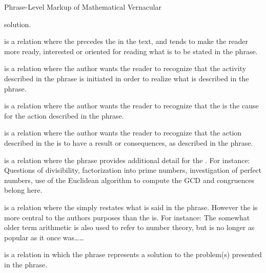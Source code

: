 \begin{module}[id=mtext]
\begin{omgroup}[id=mtext,short=Mathematical Text]
\begin{omgroup}[id=phrases]{Phrase-Level Markup of Mathematical Vernacular}
\begin{description}
  solution.
\item[{\attval[ns-elt=h]{preparation}{relation}{span}}] is a relation where the
   precedes the  in the
  text, and tends to make the reader more ready, interested or oriented for reading what
  is to be stated in the  phrase.
\item[{\attval[ns-elt=h]{purpose}{relation}{span}}] is a relation where the author wants the
  reader to recognize that the activity described in the 
  phrase is initiated in order to realize what is described in the
   phrase.
\item[{\attval[ns-elt=h]{cause}{relation}{span}}] is a relation where the author wants the reader
  to recognize that the  is the cause for the action
  described in the  phrase.
\item[{\attval[ns-elt=h]{consequence}{relation}{span}}] is a relation where the author wants the
  reader to recognize that the action described in the  is
  to have a result or consequences, as described in the 
  phrase.
\item[{\attval[ns-elt=h]{elaboration}{relation}{span}}] is a relation where the
   phrase provides additional detail for the
  .  For instance: {}
  Questions of divisibility, factorization into prime numbers, investigation of perfect
  numbers, use of the Euclidean algorithm to compute the GCD and congruences belong here.
\item[{\attval[ns-elt=h]{restatement}{relation}{span}}] is a relation where the
   simply restates what is said in the
   phrase. However the  is
  more central to the authors purposes than the  is.
  For instance: The somewhat older term arithmetic is also used to refer to number theory,
  but is no longer as popular as it once was\ldots \ldots {}
\item[{\attval[ns-elt=h]{solutionhood}{relation}{span}}] is a relation in which the
   phrase represents a solution to the problem(s)
  presented in the  phrase.
\end{description}


\end{omgroup}
\end{omgroup}
\end{module}
